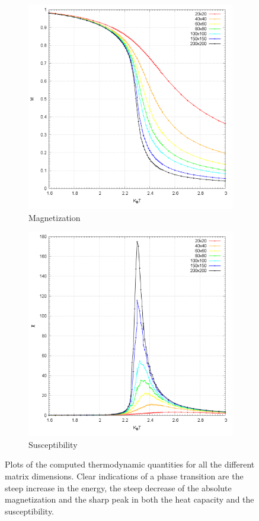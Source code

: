 \documentclass[10pt,a4paper,titlepage]{article}
\begin{document}
\begin{figure}[H]
\centering
\begin{subfigure}{.48\textwidth}
  \centering
  \includegraphics[width=1\linewidth]{Magnetization}
  \caption{{\footnotesize Magnetization}}
  \label{fig:sfig2}
\end{subfigure}
\begin{subfigure}{.48\textwidth}
  \centering
  \includegraphics[width=1\linewidth]{Suscettibility}
  \caption{{\footnotesize Susceptibility}}
  \label{fig:sfig2}
\end{subfigure}
\caption{{\footnotesize Plots of the computed thermodynamic quantities for all the different matrix dimensions. Clear indications of a phase transition are the steep increase in the energy, the steep decrease of the absolute magnetization and the sharp peak in both the heat capacity and the susceptibility.}}
\label{fig:fig}
\end{figure}
\end{document}
